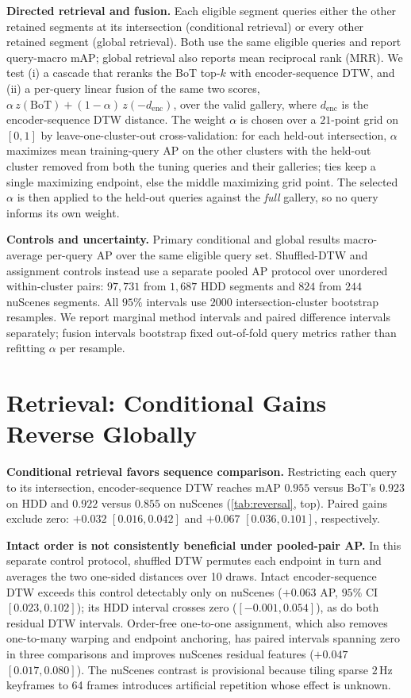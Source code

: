 \documentclass[runningheads]{llncs}
\begin{document}
\textbf{Directed retrieval and fusion.} Each eligible segment queries either the other retained
segments at its intersection (conditional retrieval) or every other retained segment (global
retrieval). Both use the same eligible queries and report query-macro mAP; global retrieval also
reports mean reciprocal rank (MRR). We test (i) a cascade that reranks the BoT top-$k$ with
encoder-sequence DTW, and (ii) a per-query linear fusion of the same two scores,
$\alpha\,z(\text{BoT}) + (1{-}\alpha)\,z(-d_\mathrm{enc})$, over the valid gallery, where
$d_\mathrm{enc}$ is the encoder-sequence DTW distance.
The weight $\alpha$ is chosen over a $21$-point grid on $[0,1]$ by leave-one-cluster-out
cross-validation: for each held-out intersection, $\alpha$ maximizes mean training-query AP on the
other clusters with the held-out cluster removed from both the tuning queries and their galleries;
ties keep a single maximizing endpoint, else the middle maximizing grid point. The selected
$\alpha$ is then applied to the held-out queries against the \emph{full} gallery, so no query
informs its own weight.

\textbf{Controls and uncertainty.} Primary conditional and global results macro-average per-query
AP over the same eligible query set. Shuffled-DTW and assignment controls instead use a separate
pooled AP protocol over unordered within-cluster pairs: $97{,}731$ from $1{,}687$ HDD segments and
$824$ from $244$ nuScenes segments. All $95\%$ intervals use $2000$ intersection-cluster bootstrap
resamples. We report marginal method intervals and paired difference intervals separately; fusion
intervals bootstrap fixed out-of-fold query metrics rather than refitting $\alpha$ per resample.

\section{Retrieval: Conditional Gains Reverse Globally}
\label{sec:retrieval}
\textbf{Conditional retrieval favors sequence comparison.} Restricting each query to its
intersection, encoder-sequence DTW reaches mAP $0.955$ versus BoT's $0.923$ on HDD and $0.922$
versus $0.855$ on nuScenes (\cref{tab:reversal}, top). Paired gains exclude zero: $+0.032$
$[0.016, 0.042]$ and $+0.067$ $[0.036, 0.101]$, respectively.

\textbf{Intact order is not consistently beneficial under pooled-pair AP.} In this separate control
protocol, shuffled DTW permutes each endpoint in turn and averages the two one-sided distances over
10 draws. Intact encoder-sequence DTW exceeds this control detectably only on nuScenes ($+0.063$ AP,
$95\%$ CI $[0.023, 0.102]$); its HDD interval crosses zero ($[-0.001, 0.054]$), as do both residual
DTW intervals. Order-free one-to-one assignment, which also removes one-to-many warping and endpoint
anchoring, has paired intervals spanning zero in three comparisons and improves nuScenes residual
features ($+0.047$ $[0.017, 0.080]$). The nuScenes contrast is provisional because tiling sparse
$2$\,Hz keyframes to 64 frames introduces artificial repetition whose effect is unknown.
\end{document}
